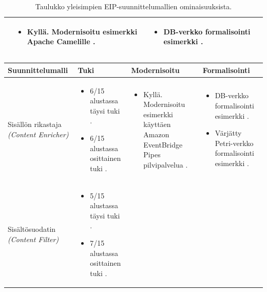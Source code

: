 \begin{table}[h]
\begin{tabular}{|p{}|p{}|p{}|p{}|}
      &
        \begin{itemize}
           \item Kyllä. Modernisoitu esimerkki Apache Camelille \citep{HohpeModernExamples}.
        \end{itemize}
      &
        \begin{itemize}
           \item DB-verkko formalisointi esimerkki \citep{Ritter2021}.
        \end{itemize}
      \\ \hline
    \end{tabular}
   \caption{Taulukko yleisimpien EIP-suunnittelumallien ominaisuuksista.}
   \label{table:eip1}
\end{table}



\begin{table}[h]
\centering
    \begin{tabular}{|p{}|p{}|p{}|p{}|}
    \hline
    Suunnittelumalli & Tuki & Modernisoitu & Formalisointi \\ \hline
    Sisällön rikastaja \textit{(Content Enricher)} & 
        \begin{itemize}
            \item 6/15 alustassa täysi tuki \citep{Ritter2017}.
            \item 6/15 alustassa osittainen tuki \citep{Ritter2017}.
        \end{itemize}
      &
        \begin{itemize}
           \item Kyllä. Modernisoitu esimerkki käyttäen Amazon EventBridge Pipes pilvipalvelua \citep{HohpeModernExamples}.
        \end{itemize}
      &
        \begin{itemize}
           \item DB-verkko formalisointi esimerkki \citep{Ritter2021}.
           \item Värjätty Petri-verkko formalisointi esimerkki \citep{Fahland2013}.
        \end{itemize}
      \\ \hline
    Sisältösuodatin \textit{(Content Filter)} & 
        \begin{itemize}
            \item 5/15 alustassa täysi tuki \citep{Ritter2017}.
            \item 7/15 alustassa osittainen tuki \citep{Ritter2017}.

\end{itemize}
\end{tabular}
\end{table}

